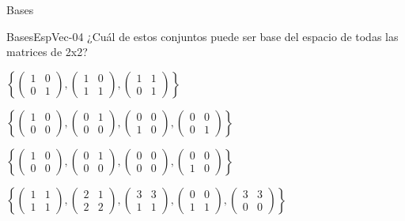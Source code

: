 \documentclass[a4,11pt]{aleph-notas}
\begin{document}
\begin{quiz}{Bases}
\begin{multi}[]%
    {BasesEspVec-04}
    ¿Cuál de estos conjuntos puede ser base del espacio de todas las matrices de 2x2?
    \item $\left\{ \begin{pmatrix} 1 & 0 \\ 0 & 1 \end{pmatrix}, \begin{pmatrix} 1 & 0 \\ 1 & 1 \end{pmatrix}, \begin{pmatrix} 1 & 1 \\ 0 & 1 \end{pmatrix} \right\}$
    \item* $\left\{ \begin{pmatrix} 1 & 0 \\ 0 & 0 \end{pmatrix}, \begin{pmatrix} 0 & 1 \\ 0 & 0 \end{pmatrix}, \begin{pmatrix} 0 & 0 \\ 1 & 0 \end{pmatrix}, \begin{pmatrix} 0 & 0 \\ 0 & 1 \end{pmatrix} \right\}$
    \item $\left\{ \begin{pmatrix} 1 & 0 \\ 0 & 0 \end{pmatrix}, \begin{pmatrix} 0 & 1 \\ 0 & 0 \end{pmatrix}, \begin{pmatrix} 0 & 0 \\ 0 & 0 \end{pmatrix}, \begin{pmatrix} 0 & 0 \\ 1 & 0 \end{pmatrix} \right\}$
    \item $\left\{ \begin{pmatrix} 1 & 1 \\ 1 & 1 \end{pmatrix}, \begin{pmatrix} 2 & 1 \\ 2 & 2 \end{pmatrix}, \begin{pmatrix} 3 & 3 \\ 1 & 1 \end{pmatrix}, \begin{pmatrix} 0 & 0 \\ 1 & 1 \end{pmatrix}, \begin{pmatrix} 3 & 3 \\ 0 & 0 \end{pmatrix} \right\}$
\end{multi}


\end{quiz}
\end{document}
